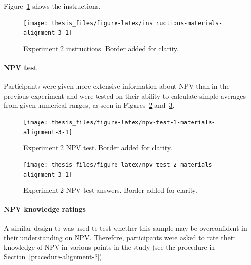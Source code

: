 \documentclass[a4paper, nobind, dvipsnames]{templates/ociamthesis}
\theoremstyle{definition}
\theoremstyle{definition}
\theoremstyle{definition}
\theoremstyle{definition}
\theoremstyle{remark}
\begin{document}
Figure~\ref{fig:instructions-materials-alignment-3} shows the instructions.



\begin{figure}
\texttt{[image: thesis\_files/figure-latex/instructions-materials-alignment-3-1]} \caption{Experiment 2 instructions. Border added for clarity.}\label{fig:instructions-materials-alignment-3}
\end{figure}

\hypertarget{npv-test-materials-alignment-3}{%
\paragraph{NPV test}\label{npv-test-materials-alignment-3}}

Participants were given more extensive information about NPV than in the
previous experiment and were tested on their ability to calculate simple
averages from given numerical ranges, as seen in
Figures~\ref{fig:npv-test-1-materials-alignment-3}
and~\ref{fig:npv-test-2-materials-alignment-3}.



\begin{figure}
\texttt{[image: thesis\_files/figure-latex/npv-test-1-materials-alignment-3-1]} \caption{Experiment 2 NPV test. Border added for clarity.}\label{fig:npv-test-1-materials-alignment-3}
\end{figure}



\begin{figure}
\texttt{[image: thesis\_files/figure-latex/npv-test-2-materials-alignment-3-1]} \caption{Experiment 2 NPV test answers. Border added for clarity.}\label{fig:npv-test-2-materials-alignment-3}
\end{figure}

\hypertarget{npv-knowledge-materials-alignment-3}{%
\paragraph{NPV knowledge ratings}\label{npv-knowledge-materials-alignment-3}}

A similar design to \textcite[Study 1]{long2018} was used to test whether this sample may
be overconfident in their understanding on NPV. Therefore, participants were
asked to rate their knowledge of NPV in various points in the study (see the
procedure in Section~\ref{procedure-alignment-3}).
\end{document}

